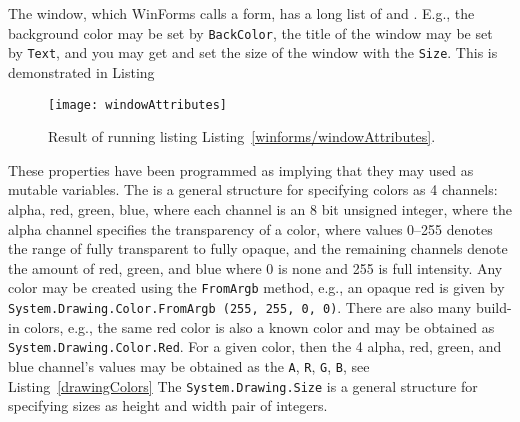 The window, which WinForms calls a form, has a long list of  and . E.g., the background color may be set by \lstinline!BackColor!, the title of the window may be set by \lstinline!Text!, and you may get and set the size of the window with the \lstinline!Size!. This is demonstrated in Listing
%
%
\begin{figure}
  \centering
  \texttt{[image: windowAttributes]}
  \caption{Result of running listing Listing~\ref{winforms/windowAttributes}.}
  \label{fig:openWindow}
\end{figure}
These properties have been programmed as  implying that they may used as mutable variables. The  is a general structure for specifying colors as 4 channels: alpha, red, green, blue, where each channel is an 8 bit unsigned integer, where the alpha channel specifies the transparency of a color, where values 0--255 denotes the range of fully transparent to fully opaque, and the remaining channels denote the amount of red, green, and blue where 0 is none and 255 is full intensity. Any color may be created using the \lstinline!FromArgb! method, e.g., an opaque red is given by \lstinline!System.Drawing.Color.FromArgb (255, 255, 0, 0)!. There are also many build-in colors, e.g., the same red color is also a known color and may be obtained as \lstinline!System.Drawing.Color.Red!. For a given color, then the 4 alpha, red, green, and blue channel's values may be obtained as the \lstinline!A!, \lstinline!R!, \lstinline!G!, \lstinline!B!, see Listing~\ref{drawingColors}
%
%
The \lstinline!System.Drawing.Size! is a general structure for specifying sizes as height and width pair of integers.

